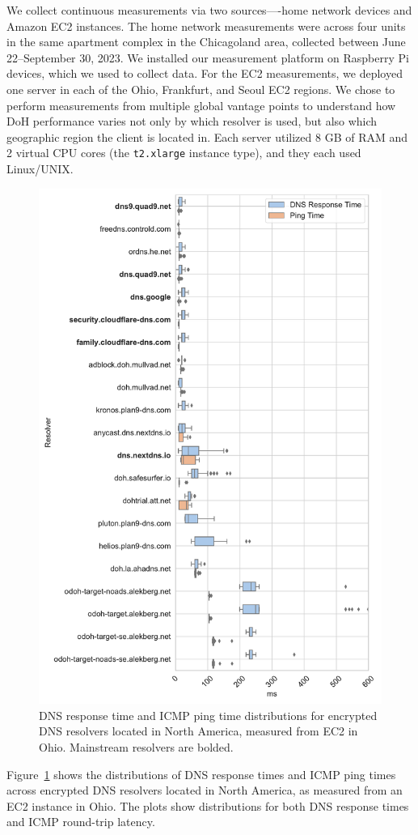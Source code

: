 We collect continuous measurements via two sources—-home network devices and Amazon EC2 instances. The home network measurements were across four units in the same apartment complex in the Chicagoland area, collected between June 22--September 30, 2023. 
We installed our measurement platform on Raspberry Pi devices, which we used to  collect data. 
For the EC2 measurements, we deployed one server
in each of the Ohio, Frankfurt, and Seoul EC2 regions.  We chose to perform
measurements from multiple global vantage points to understand how DoH
performance varies not only by which resolver is used, but also which
geographic region the client is located in.  Each server utilized 8 GB of RAM
and 2 virtual CPU cores (the \texttt{t2.xlarge} instance type), and they each
used Linux/UNIX.

\begin{figure}[!htbp]
\centering
\includegraphics[width=0.6\columnwidth]{figures/ohio_NA.pdf}
\caption{DNS response time and ICMP ping time distributions for
    encrypted DNS resolvers located in North America, measured from EC2 in Ohio. Mainstream resolvers are bolded.}
    \label{fig:dns-us-ohio}
\end{figure}

Figure~\ref{fig:dns-us-ohio} shows the distributions of DNS response times and
ICMP ping times across encrypted DNS resolvers located in North America, as
measured from an EC2 instance in Ohio. The plots show distributions for both DNS response times and ICMP round-trip latency.

